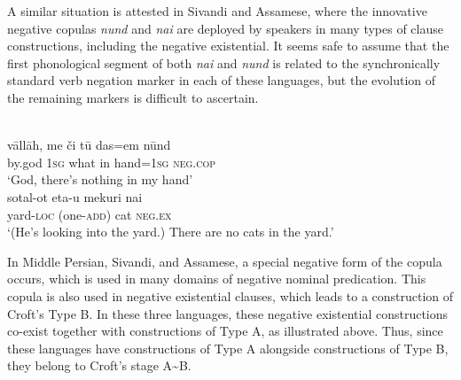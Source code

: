 ﻿\documentclass[output=paper]{langsci/langscibook}
\begin{document}
A similar situation is attested in Sivandi and Assamese, where the innovative negative copulas \textit{nund} and \textit{nai} are deployed by speakers in many types of clause constructions, including the negative existential. It seems safe to assume that the first phonological segment of both \textit{nai} and \textit{nund} is related to the synchronically standard verb negation marker in each of these languages, but the evolution of the remaining markers is difficult to ascertain. 
%
\begin{exe}\ex\label{ex:ieur-sivandi-nothing-in-hand}
\\
    \gll vāllāh, me    či      tū  das=em      nūnd \\
by.god  \textsc{1sg}  what  in  hand=\textsc{1sg}  \textsc{neg.cop} \\
    \glt `God, there's nothing in my hand'
\ex\label{ex:ieur-assamese-nocats}
\\
    \gll sotal-ot    {\op}eta-u{\cp}      mekuri nai \\
yard-\textsc{loc} (one-\textsc{add}) cat \textsc{neg.ex} \\
    \glt `(He's looking into the yard.) There are no cats in the yard.'
    \end{exe}

In Middle Persian, Sivandi, and
Assamese, a special negative form of the copula occurs, which is used in many domains of negative nominal predication. This copula is also used in negative existential clauses, which leads to a construction of Croft's Type B. In these three languages, these negative existential constructions co-exist together with constructions of Type A, as illustrated above. Thus, since these languages have constructions of Type A alongside constructions of Type B, they belong to Croft's stage A{\textasciitilde}B. 
\end{document}
